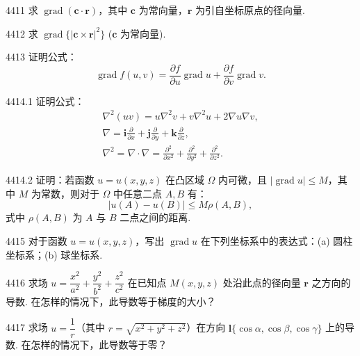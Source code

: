 \begin{prob}[S]{4411}
求 $\operatorname{grad}(\boldsymbol{c} \cdot \boldsymbol{r})$，其中 $\boldsymbol{c}$ 为常向量，$\boldsymbol{r}$ 为引自坐标原点的径向量.
\end{prob}

\begin{prob}[S]{4412}
求 $\operatorname{grad}\{|\boldsymbol{c} \times \boldsymbol{r}|^2\}$ ($\boldsymbol{c}$ 为常向量).
\end{prob}

\begin{prob}[M]{4413}
证明公式：
\[
\operatorname{grad} f(u, v) = \frac{\partial f}{\partial u} \operatorname{grad} u + \frac{\partial f}{\partial v} \operatorname{grad} v.
\]
\end{prob}

\begin{prob}[M]{4414.1}
证明公式：
\[
\begin{gathered}
\nabla^2(uv) = u \nabla^2 v + v \nabla^2 u + 2 \nabla u \nabla v, \\
\nabla = \boldsymbol{i}\frac{\partial}{\partial x} + \boldsymbol{j}\frac{\partial}{\partial y} + \boldsymbol{k}\frac{\partial}{\partial z}, \\
\nabla^2 = \nabla \cdot \nabla = \frac{\partial^2}{\partial x^2} + \frac{\partial^2}{\partial y^2} + \frac{\partial^2}{\partial z^2}.
\end{gathered}
\]
\end{prob}

\begin{prob}[M]{4414.2}
证明：若函数 $u = u(x, y, z)$ 在凸区域 $\Omega$ 内可微，且 $|\operatorname{grad} u| \leqslant M$，其中 $M$ 为常数，则对于 $\Omega$ 中任意二点 $A, B$ 有：
\[
|u(A) - u(B)| \leqslant M \rho(A, B),
\]
式中 $\rho(A, B)$ 为 $A$ 与 $B$ 二点之间的距离.
\end{prob}

\begin{prob}[M]{4415}
对于函数 $u = u(x, y, z)$，写出 $\operatorname{grad} u$ 在下列坐标系中的表达式：(a) 圆柱坐标系；\qquad (b) 球坐标系.
\end{prob}

\begin{prob}[M]{4416}
求场 $u = \dfrac{x^2}{a^2} + \dfrac{y^2}{b^2} + \dfrac{z^2}{c^2}$ 在已知点 $M(x, y, z)$ 处沿此点的径向量 $\boldsymbol{r}$ 之方向的导数. 在怎样的情况下，此导数等于梯度的大小？
\end{prob}

\begin{prob}[M]{4417}
求场 $u = \dfrac{1}{r}$（其中 $r = \sqrt{x^2 + y^2 + z^2}$）在方向 $\boldsymbol{l}\{\cos\alpha, \cos\beta, \cos\gamma\}$ 上的导数. 在怎样的情况下，此导数等于零？
\end{prob}


